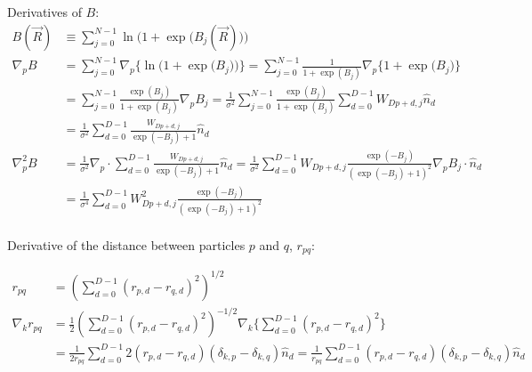 \documentclass[12pt]{article}
\begin{document}
\noindent Derivatives of $B$:
\begin{align*}
B(\vec{R}) &\equiv \sum_{j=0}^{N-1} \ln \Big(  1 + \exp \big( B_j (\vec{R}) \big) \Big)\\
\nabla_p  B  &= \sum_{j=0}^{N-1}\nabla_p \bigg\{  \ln \Big(  1 + \exp \big( B_j \big) \Big) \bigg\} = \sum_{j=0}^{N-1} \frac{1}{1+\exp(B_j)} \nabla_p  \bigg\{  1 + \exp \big( B_j \big) \bigg\} \\
&=\sum_{j=0}^{N-1} \frac{\exp(B_j)}{1+\exp(B_j)} \nabla_p B_j =  \frac{1}{\sigma^2} \sum_{j=0}^{N-1} \frac{\exp(B_j)}{1+\exp(B_j)}\sum_{d=0}^{D-1} W_{Dp+d,j} \hat{n}_d\\
&= \frac{1}{\sigma^2} \sum_{d=0}^{D-1} \frac{W_{Dp+d,j}}{\exp(-B_j)+1}  \hat{n}_d\\
\nabla_p^2 B &= \frac{1}{\sigma^2} \nabla_p \cdot \sum_{d=0}^{D-1} \frac{W_{Dp+d,j}}{\exp(-B_j)+1}  \hat{n}_d = \frac{1}{\sigma^2} \sum_{d=0}^{D-1} W_{Dp+d,j} \frac{\exp(-B_j)}{(\exp(-B_j)+1)^2} \nabla_p B_j \cdot \hat{n}_d \\
&= \frac{1}{\sigma^4} \sum_{d=0}^{D-1} W_{Dp+d,j}^2 \frac{\exp(-B_j)}{(\exp(-B_j)+1)^2}\\
\end{align*}

\noindent Derivative of the distance between particles $p$ and $q$, $r_{pq}$:

\begin{align*}
r_{pq} &= \left( \sum_{d=0}^{D-1} (r_{p,d}-r_{q,d})^2 \right)^{1/2}\\
\nabla_k r_{pq} &= \frac{1}{2} \left( \sum_{d=0}^{D-1} (r_{p,d}-r_{q,d})^2 \right)^{-1/2} \nabla_k \bigg\{ \sum_{d=0}^{D-1} (r_{p,d}-r_{q,d})^2 \bigg\} \\
&= \frac{1}{2 r_{pq}} \sum_{d=0}^{D-1} 2(r_{p,d}-r_{q,d})(\delta_{k,p}-\delta_{k,q}) \hat{n}_{d} = \frac{1}{r_{pq}} \sum_{d=0}^{D-1} (r_{p,d}-r_{q,d}) (\delta_{k,p}-\delta_{k,q}) \hat{n}_{d} \\ \\
\end{align*}
\end{document}
